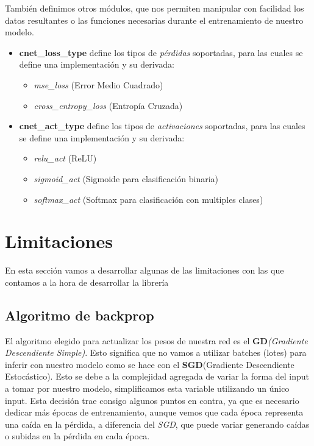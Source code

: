 \documentclass [a4paper,12pt,oneside,final]{article}
\begin{document}
También definimos otros módulos, que nos permiten manipular con facilidad los datos resultantes o las funciones necesarias durante el entrenamiento de nuestro modelo.

\begin{itemize}
    \item{{\bf cnet\_loss\_type} define los tipos de {\it pérdidas} soportadas, para las cuales se define una implementación y su derivada:}
        \begin{itemize}
            \item{{\it mse\_loss} (Error Medio Cuadrado)}
            \item{{\it cross\_entropy\_loss} (Entropía Cruzada)}
        \end{itemize}
    \item{{\bf cnet\_act\_type} define los tipos de {\it activaciones} soportadas, para las cuales se define una implementación y su derivada:}
        \begin{itemize}
            \item{{\it relu\_act} (ReLU)}
            \item{{\it sigmoid\_act} (Sigmoide para clasificación binaria)}
            \item{{\it softmax\_act} (Softmax para clasificación con multiples clases)}
        \end{itemize}
\end{itemize}

\section{Limitaciones}

En esta sección vamos a desarrollar algunas de las limitaciones con las que contamos a la hora de desarrollar la librería

\subsection{Algoritmo de backprop}

El algoritmo elegido para actualizar los pesos de nuestra red es el {\bf GD}{\it (Gradiente Descendiente Simple)}. Esto significa que no vamos a utilizar batches (lotes) para inferir con nuestro modelo como se hace con el {\bf SGD}(Gradiente Descendiente Estocástico). Esto se debe a la complejidad agregada de variar la forma del input a tomar por nuestro modelo, simplificamos esta variable utilizando un único input. Esta decisión trae consigo algunos puntos en contra, ya que es necesario dedicar más épocas de entrenamiento, aunque vemos que cada época representa una caída en la pérdida, a diferencia del {\it SGD}, que puede variar generando caídas o subidas en la pérdida en cada época.
\end{document}
